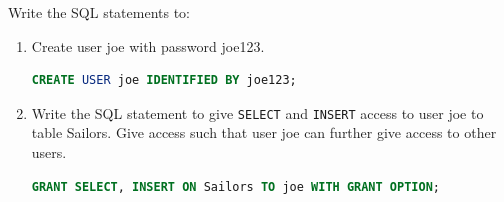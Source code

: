 \documentclass[letterpaper, 11pt]{article}
\begin{document}
Write the SQL statements to:
\begin{enumerate}[label={\alph*}),leftmargin=*]
    \item Create user joe with password joe123.

\begin{tcolorbox}
\begin{lstlisting}[language=SQL]
CREATE USER joe IDENTIFIED BY joe123;
\end{lstlisting}
\end{tcolorbox}

    \item Write the SQL statement to give \texttt{SELECT} and \texttt{INSERT} access to user joe to table Sailors. Give access such that user joe can further give access to other users. 

\begin{tcolorbox}
\begin{lstlisting}[language=SQL]
GRANT SELECT, INSERT ON Sailors TO joe WITH GRANT OPTION;
\end{lstlisting}
\end{tcolorbox}
\end{enumerate}
\end{document}
